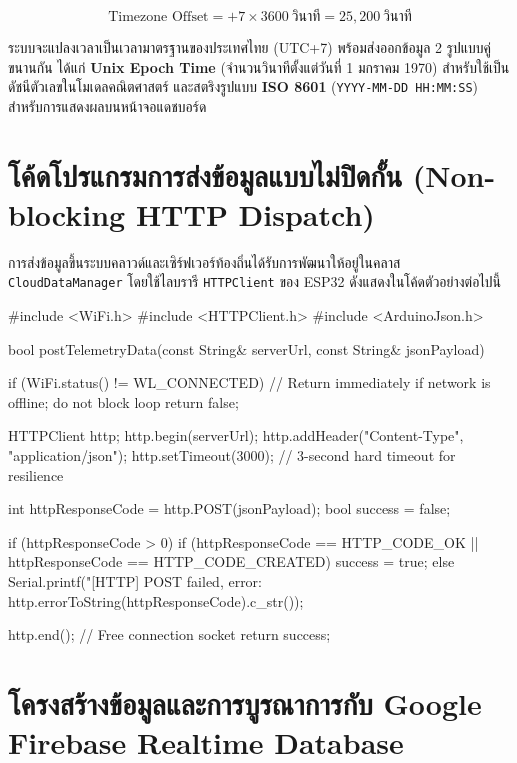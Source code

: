 \begin{equation}
    \text{Timezone Offset} = +7 \times 3600\ \text{วินาที} = 25,200\ \text{วินาที}
    \label{eq:ntp_offset}
\end{equation}

ระบบจะแปลงเวลาเป็นเวลามาตรฐานของประเทศไทย (UTC+7) พร้อมส่งออกข้อมูล 2 รูปแบบคู่ขนานกัน ได้แก่ \textbf{Unix Epoch Time} (จำนวนวินาทีตั้งแต่วันที่ 1 มกราคม 1970) สำหรับใช้เป็นดัชนีตัวเลขในโมเดลคณิตศาสตร์ และสตริงรูปแบบ \textbf{ISO 8601} (\texttt{YYYY-MM-DD HH:MM:SS}) สำหรับการแสดงผลบนหน้าจอแดชบอร์ด

\section{โค้ดโปรแกรมการส่งข้อมูลแบบไม่ปิดกั้น (Non-blocking HTTP Dispatch)}

การส่งข้อมูลขึ้นระบบคลาวด์และเซิร์ฟเวอร์ท้องถิ่นได้รับการพัฒนาให้อยู่ในคลาส \texttt{CloudDataManager} โดยใช้ไลบรารี \texttt{HTTPClient} ของ ESP32 ดังแสดงในโค้ดตัวอย่างต่อไปนี้

\begin{pythonbox}
#include <WiFi.h>
#include <HTTPClient.h>
#include <ArduinoJson.h>

bool postTelemetryData(const String& serverUrl, const String& jsonPayload) {
    if (WiFi.status() != WL_CONNECTED) {
        // Return immediately if network is offline; do not block loop
        return false;
    }

    HTTPClient http;
    http.begin(serverUrl);
    http.addHeader("Content-Type", "application/json");
    http.setTimeout(3000); // 3-second hard timeout for resilience

    int httpResponseCode = http.POST(jsonPayload);
    bool success = false;

    if (httpResponseCode > 0) {
        if (httpResponseCode == HTTP_CODE_OK || 
            httpResponseCode == HTTP_CODE_CREATED) {
            success = true;
        }
    } else {
        Serial.printf("[HTTP] POST failed, error: %
                      http.errorToString(httpResponseCode).c_str());
    }

    http.end(); // Free connection socket
    return success;
}
\end{pythonbox}

\section{โครงสร้างข้อมูลและการบูรณาการกับ Google Firebase Realtime Database}

